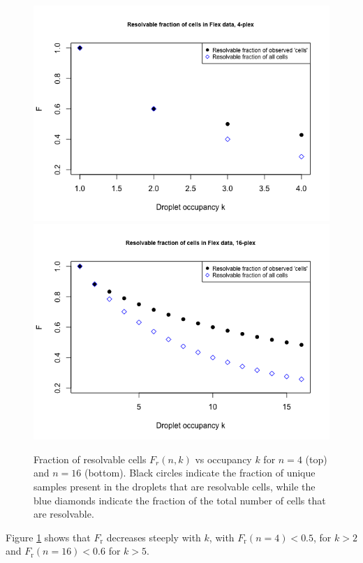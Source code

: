 \documentclass[unnumsec,webpdf,modern,large]{oup-authoring-template}
\begin{document}
	\begin{figure}
		\begin{center}
			\includegraphics[scale=0.3]{figures/observable_fraction_GEM_occupancy_n4.png}	\\
			\includegraphics[scale=0.3]{figures/observable_fraction_GEM_occupancy_n16.png}	
			\caption{Fraction of resolvable cells $F_r(n, k)$ vs occupancy $k$ for $n = 4$ (top) and $n = 16$ (bottom).
			Black circles indicate the fraction of unique samples present in the droplets that are resolvable cells, while the blue diamonds indicate the fraction of the total number of cells that are resolvable.
			}		
			\label{fig:resolvable_fraction}
		\end{center}
	\end{figure}
	Figure \ref{fig:resolvable_fraction} shows that $F_{\mathrm{r}}$ decreases steeply with $k$, with $F_{\mathrm{r}}(n = 4) < 0.5$,  for $k > 2$ and $F_{\mathrm{r}}(n = 16) < 0.6$ for $k > 5$.
	
\end{document}
